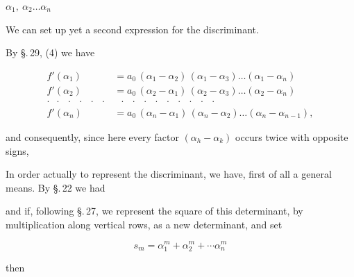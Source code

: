
$\alpha_1,\ \alpha_2 \ldots \alpha_n$ 

We can set up yet a second expression for the
discriminant.

By \S.\,29, (4) we have

\[
\begin{aligned}
f'(\alpha_1) &= a_0\,(\alpha_1 - \alpha_2)\,(\alpha_1 - \alpha_3)\ldots(\alpha_1 - \alpha_n)\\
f'(\alpha_2) &= a_0\,(\alpha_2 - \alpha_1)\,(\alpha_2 - \alpha_3)\ldots(\alpha_2 - \alpha_n)\\
\cdot\;\;\cdot\;\;\cdot\;\;\cdot\;\;\cdot\;\;\cdot &\;\;\cdot\;\;\cdot\;\;\cdot\;\;\cdot\;\;\cdot\;\;\cdot\;\;\cdot\;\;\cdot\;\;\cdot\\
f'(\alpha_n) &= a_0\,(\alpha_n - \alpha_1)\,(\alpha_n - \alpha_2)\ldots(\alpha_n - \alpha_{n-1}),
\end{aligned}
\]

and consequently, since here every factor $(\alpha_h - \alpha_k)$ occurs twice with
opposite signs,


In order actually to represent the discriminant, we have, first of all a general means. %
By \S.\,22 we had


and if, following \S.\,27, we represent the square of this determinant,
by multiplication along vertical rows, as a new determinant,
and set

\[
s_m = \alpha_1^m + \alpha_2^m + \cdots \alpha_n^m
\]

then


